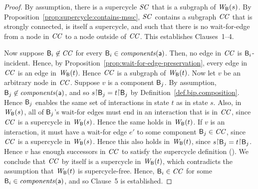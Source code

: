 \begin{proof}
By assumption, there is a supercycle $\mathit{SC}$ that is a subgraph of $\mathit{W}_{\mathsf{B}}({s})$.  By Proposition~\ref{prop:supercycle:contains-mssc}, $\mathit{SC}$ contains
a subgraph $\mathit{CC}$ that is strongly connected, is itself a supercycle, and such that there is no wait-for-edge from a node in $\mathit{CC}$ to a node outside
of $\mathit{CC}$.  This establishes Clauses~1--4.

Now suppose $\mathsf{B}_i \not\in \mathit{CC}$ for every $\mathsf{B}_i \in \mathit{components}(\mathsf{a})$. Then, no edge in $\mathit{CC}$ is
$\mathsf{B}_i$-incident.  Hence, by Proposition~\ref{prop:wait-for-edge-preservation}, every edge in $\mathit{CC}$
is an edge in $\mathit{W}_{\mathsf{B}}({t})$. Hence $\mathit{CC}$ is a subgraph of $\mathit{W}_{\mathsf{B}}({t})$.
%
Now let $v$ be an arbitrary node in $\mathit{CC}$.
%
Suppose $v$ is a component $\mathsf{B}_j$.  By assumption, $\mathsf{B}_j \not\in \mathit{components}(\mathsf{a})$, and so
$s \pj \B_j = t \pj \B_j$ by Definition~\ref{def.bip.composition}. Hence $\mathsf{B}_j$ enables the same set
of interactions in state $t$ as in state $s$. Also, in $\mathit{W}_{\mathsf{B}}({s})$, all of $\mathsf{B}_j$'s wait-for edges
must end in an interaction that is in $\mathit{CC}$, since $\mathit{CC}$ is a supercycle in $\mathit{W}_{\mathsf{B}}({s})$. Hence the
same holds in $\mathit{W}_{\mathsf{B}}({t})$.
%
If $v$ is an interaction, it must have a wait-for edge $e'$ to some component $\mathsf{B}_j \in \mathit{CC}$,
since $\mathit{CC}$ is a supercycle in $\mathit{W}_{\mathsf{B}}({s})$. Hence this also holds in $\mathit{W}_{\mathsf{B}}({t})$, since $s \pj \B_j = t \pj \B_j$.
%
Hence $v$ has enough successors in $\mathit{CC}$ to satisfy the supercycle definition ().
%
We conclude that $\mathit{CC}$ by itself is a supercycle in $\mathit{W}_{\mathsf{B}}({t})$, which contradicts the assumption
that $\mathit{W}_{\mathsf{B}}({t})$ is supercycle-free. Hence, $\mathsf{B}_i \in \mathit{CC}$ for some $\mathsf{B}_i \in \mathit{components}(\mathsf{a})$, and so
Clause~5 is established.  
\end {proof}



